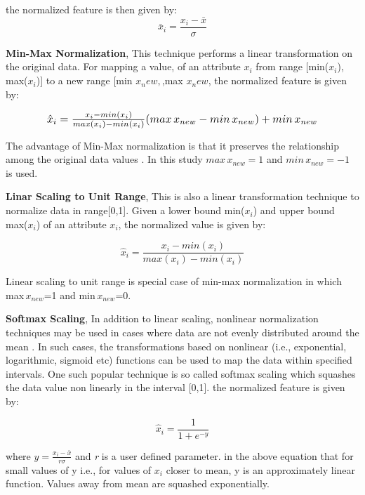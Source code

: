 the normalized feature is then given by:
\begin{equation}
\bar{x}_i=\frac{x_i-\bar{x}}{\sigma}
\end{equation}

\textbf{Min-Max Normalization}, This technique performs a linear transformation on the original data. For mapping a value, of an attribute \(x_i\) from range [min(\(x_i\)), max(\(x_i\))] to a new range [min \(x_new,\),max \(x_new\), the normalized feature is given by:

\begin{equation}
\resizebox{.8\hsize}{!}{$\hat{x}_i=\frac{x_i-min(x_i)}{max(x_i)-min(x_i)}(max\,x_{new}-min\,x_{new})+min\,x_{new}$}
\end{equation}

The advantage of Min-Max normalization is that it preserves the relationship among the original data values \cite{manikandan2013achieving}. In this study \(max\,x_{new}=1\) and \(min\,x_{new}=-1\) is used.

\textbf{Linar Scaling to Unit Range}, This is also a linear transformation technique to normalize data in range[0,1]. Given a lower bound min(\(x_i\)) and upper bound max(\(x_i\)) of an attribute \(x_i\), the normalized value is given by:

\begin{equation}
\hat{x}_i=\frac{x_i-min(x_i)}{max(x_i)-min(x_i)}
\end{equation}

Linear scaling to unit range is special case of min-max normalization in which max\(\,x_{new}\)=1 and min\(\,x_{new}\)=0.

\textbf{Softmax Scaling}, In addition to linear scaling, nonlinear normalization techniques may be used in cases where data are not evenly distributed around the mean \cite{theodoridis2010introduction}. In such cases, the transformations based on nonlinear (i.e., exponential, logarithmic, sigmoid etc) functions can be used to map the data within specified intervals. One such popular technique is so called softmax scaling which squashes the data value non linearly in the interval [0,1]. the normalized feature is given by:

\begin{equation}
\hat{x}_i=\frac{1}{1+e^{-y}}
\end{equation}

where \(y=\frac{x_i-\bar{x}}{r\sigma}\) and \textit{r} is a user defined parameter. in the above equation that for small values of y i.e., for values of \(x_i\) closer to mean, y is an approximately linear function. Values away from mean are squashed exponentially.